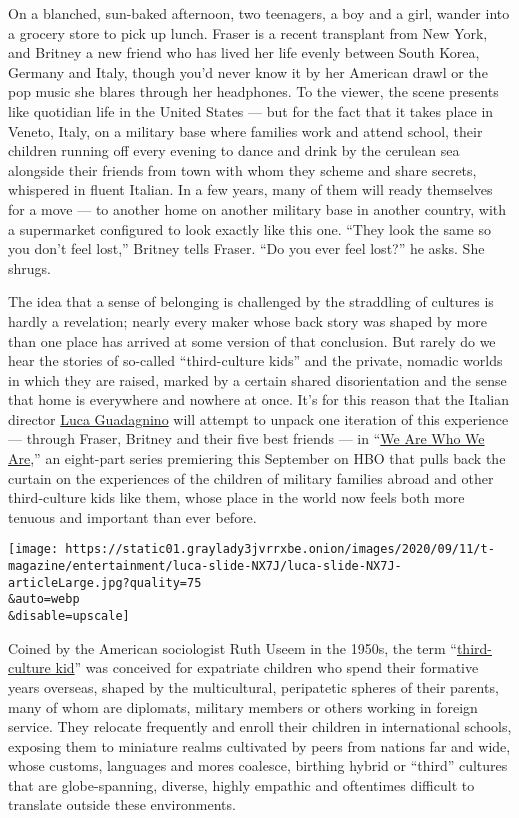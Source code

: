 On a blanched, sun-baked afternoon, two teenagers, a boy and a girl,
wander into a grocery store to pick up lunch. Fraser is a recent
transplant from New York, and Britney a new friend who has lived her
life evenly between South Korea, Germany and Italy, though you'd never
know it by her American drawl or the pop music she blares through her
headphones. To the viewer, the scene presents like quotidian life in the
United States --- but for the fact that it takes place in Veneto, Italy,
on a military base where families work and attend school, their children
running off every evening to dance and drink by the cerulean sea
alongside their friends from town with whom they scheme and share
secrets, whispered in fluent Italian. In a few years, many of them will
ready themselves for a move --- to another home on another military base
in another country, with a supermarket configured to look exactly like
this one. ``They look the same so you don't feel lost,'' Britney tells
Fraser. ``Do you ever feel lost?'' he asks. She shrugs.

The idea that a sense of belonging is challenged by the straddling of
cultures is hardly a revelation; nearly every maker whose back story was
shaped by more than one place has arrived at some version of that
conclusion. But rarely do we hear the stories of so-called
``third-culture kids'' and the private, nomadic worlds in which they are
raised, marked by a certain shared disorientation and the sense that
home is everywhere and nowhere at once. It's for this reason that the
Italian director
\href{https://www.nytimes3xbfgragh.onion/2018/09/19/t-magazine/luca-guadagnino-interior-design-lake-como-house.html}{Luca
Guadagnino} will attempt to unpack one iteration of this experience ---
through Fraser, Britney and their five best friends --- in
``\href{https://www.nytimes3xbfgragh.onion/2020/09/10/arts/television/luca-guadagnino.html}{We
Are Who We Are},'' an eight-part series premiering this September on HBO
that pulls back the curtain on the experiences of the children of
military families abroad and other third-culture kids like them, whose
place in the world now feels both more tenuous and important than ever
before.

\texttt{[image: https://static01.graylady3jvrrxbe.onion/images/2020/09/11/t-magazine/entertainment/luca-slide-NX7J/luca-slide-NX7J-articleLarge.jpg?quality=75\\\&auto=webp\\\&disable=upscale]}

Coined by the American sociologist Ruth Useem in the 1950s, the term
``\href{https://www.nytimes3xbfgragh.onion/2018/10/09/smarter-living/the-edit-moving-alot.html}{third-culture
kid}'' was conceived for expatriate children who spend their formative
years overseas, shaped by the multicultural, peripatetic spheres of
their parents, many of whom are diplomats, military members or others
working in foreign service. They relocate frequently and enroll their
children in international schools, exposing them to miniature realms
cultivated by peers from nations far and wide, whose customs, languages
and mores coalesce, birthing hybrid or ``third'' cultures that are
globe-spanning, diverse, highly empathic and oftentimes difficult to
translate outside these environments.


